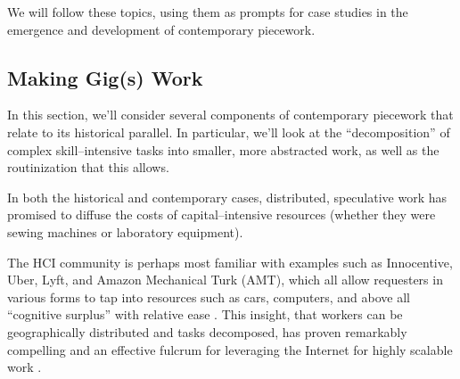 \documentclass{sigchi}
\newcommand{\msb}[1]{{\color{PineGreen}[MSB: #1]}}
\begin{document}
We will follow these topics, using them as prompts for case studies in
the emergence and
development of contemporary piecework.

\subsection{Making Gig(s) Work}\label{sec:MakingGigsWork}

In this section, we'll consider several components of contemporary piecework
that relate to its historical parallel.
In particular, we'll look at the ``decomposition'' of complex skill--intensive tasks
into smaller, more abstracted work, as well as the routinization that this allows.

In both the historical and contemporary cases,
distributed, speculative work
has promised
to diffuse the costs of capital--intensive resources
(whether they were sewing machines or laboratory equipment).


The HCI community is perhaps most familiar with examples such as
Innocentive,
Uber, Lyft,
and Amazon Mechanical Turk (AMT),
which all allow requesters in various forms to tap into
resources such as
cars,
computers, and above all
``cognitive surplus''
with relative ease
\cite{howe2006rise,DillahuntPromise,storiesIraniSilberman,shirky2010cognitive}.
This insight, that
workers can be geographically distributed and tasks decomposed,
has proven remarkably compelling
and an effective fulcrum for leveraging the Internet for highly scalable work
\cite{sensitiveTasks,embracingErrorKrishna}.
\end{document}
